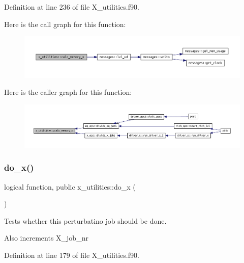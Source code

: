Definition at line 236 of file X\+\_\+utilities.\+f90.

Here is the call graph for this function\+:\nopagebreak
\begin{figure}[H]
\begin{center}
\leavevmode
\includegraphics[width=350pt]{namespacex__utilities_a4d18921da77463d069346f1c7322b451_cgraph}
\end{center}
\end{figure}
Here is the caller graph for this function\+:\nopagebreak
\begin{figure}[H]
\begin{center}
\leavevmode
\includegraphics[width=350pt]{namespacex__utilities_a4d18921da77463d069346f1c7322b451_icgraph}
\end{center}
\end{figure}
\mbox{\label{namespacex__utilities_adef8eab82f0fd670a7795c754cf9a8f9}} 
\subsubsection{\texorpdfstring{do\+\_\+x()}{do\_x()}}
{\footnotesize\ttfamily logical function, public x\+\_\+utilities\+::do\+\_\+x (\begin{DoxyParamCaption}{ }\end{DoxyParamCaption})}



Tests whether this perturbatino job should be done. 

Also increments {\ttfamily X\+\_\+job\+\_\+nr} 

Definition at line 179 of file X\+\_\+utilities.\+f90.

